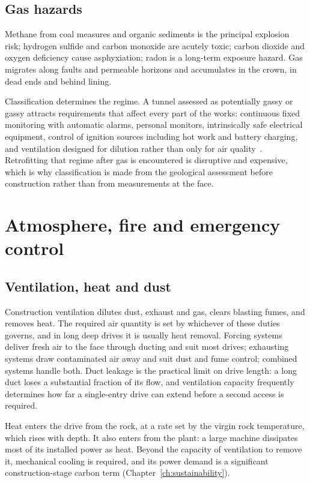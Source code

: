 \subsection{Gas hazards}
\label{sec:gas-hazards}

Methane from coal measures and organic sediments is the principal explosion
risk; hydrogen sulfide and carbon monoxide are acutely toxic; carbon dioxide
and oxygen deficiency cause asphyxiation; radon is a long-term exposure
hazard. Gas migrates along faults and permeable horizons and accumulates in
the crown, in dead ends and behind lining.

Classification determines the regime. A tunnel assessed as potentially gassy
or gassy attracts requirements that affect every part of the works:
continuous fixed monitoring with automatic alarms, personal monitors,
intrinsically safe electrical equipment, control of ignition sources including
hot work and battery charging, and ventilation designed for dilution rather
than only for air quality~\citep{bs6164,ita2008health}. Retrofitting that regime after gas is encountered
is disruptive and expensive, which is why classification is made from the
geological assessment before construction rather than from measurements at
the face.

\section{Atmosphere, fire and emergency control}
\label{sec:atmosphere-fire-emergency}

\subsection{Ventilation, heat and dust}
\label{sec:ventilation-heat-dust}

Construction ventilation dilutes dust, exhaust and gas, clears blasting fumes,
and removes heat. The required air quantity is set by whichever of these
duties governs, and in long deep drives it is usually heat removal. Forcing systems deliver fresh air to the face
through ducting and suit most drives; exhausting systems draw contaminated air
away and suit dust and fume control; combined systems handle both. Duct
leakage is the practical limit on drive length: a long duct loses a
substantial fraction of its flow, and ventilation capacity frequently
determines how far a single-entry drive can extend before a second access is
required.

Heat enters the drive from the rock, at a rate set by the virgin rock
temperature, which rises with depth. It also enters from the plant: a large machine dissipates most of its installed power as heat.
Beyond the capacity of ventilation to remove it, mechanical cooling is
required, and its power demand is a significant construction-stage carbon term
(Chapter~\ref{ch:sustainability}).

